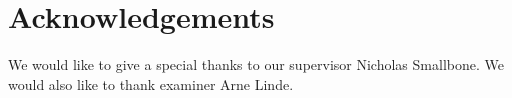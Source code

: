 \thispagestyle{plain}			%
\section*{Acknowledgements}
We would like to give a special thanks to our supervisor Nicholas Smallbone. We would also
like to thank examiner Arne Linde.


\newpage				%
\thispagestyle{empty}
\mbox{}
